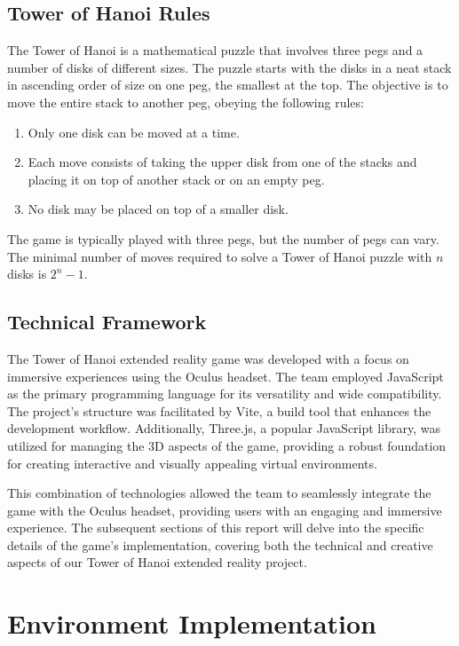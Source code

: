 \documentclass{article}
\begin{document}
\subsection{Tower of Hanoi Rules}
The Tower of Hanoi is a mathematical puzzle that involves three pegs and a number of disks of different sizes. The puzzle starts with the disks in a neat stack in ascending order of size on one peg, the smallest at the top. The objective is to move the entire stack to another peg, obeying the following rules:

\begin{enumerate}
    \item Only one disk can be moved at a time.
    \item Each move consists of taking the upper disk from one of the stacks and placing it on top of another stack or on an empty peg.
    \item No disk may be placed on top of a smaller disk.
\end{enumerate}

The game is typically played with three pegs, but the number of pegs can vary. The minimal number of moves required to solve a Tower of Hanoi puzzle with \(n\) disks is \(2^n - 1\).

\subsection{Technical Framework}
The Tower of Hanoi extended reality game was developed with a focus on immersive experiences using the Oculus headset. The team employed JavaScript as the primary programming language for its versatility and wide compatibility. The project's structure was facilitated by Vite, a build tool that enhances the development workflow. Additionally, Three.js, a popular JavaScript library, was utilized for managing the 3D aspects of the game, providing a robust foundation for creating interactive and visually appealing virtual environments.

This combination of technologies allowed the team to seamlessly integrate the game with the Oculus headset, providing users with an engaging and immersive experience. The subsequent sections of this report will delve into the specific details of the game's implementation, covering both the technical and creative aspects of our Tower of Hanoi extended reality project.





\section{Environment Implementation}
\end{document}

